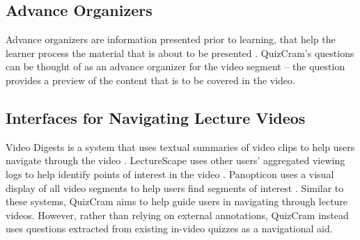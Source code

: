 \documentclass{sigchi}
\begin{document}

\subsection{Advance Organizers}

Advance organizers are information presented prior to learning, that help the learner process the material that is about to be presented  \cite{advanceorganizers}. QuizCram's questions can be thought of as an advance organizer for the video segment -- the question provides a preview of the content that is to be covered in the video. %

\subsection{Interfaces for Navigating Lecture Videos}

Video Digests is a system that uses textual summaries of video clips to help users navigate through the video \cite{videodigests}. LectureScape uses other users' aggregated viewing logs to help identify points of interest in the video \cite{lecturescape}. Panopticon uses a visual display of all video segments to help users find segments of interest \cite{panopticon}. Similar to these systems, QuizCram aims to help guide users in navigating through lecture videos. However, rather than relying on external annotations, QuizCram instead uses questions extracted from existing in-video quizzes as a navigational aid. %

\end{document}
